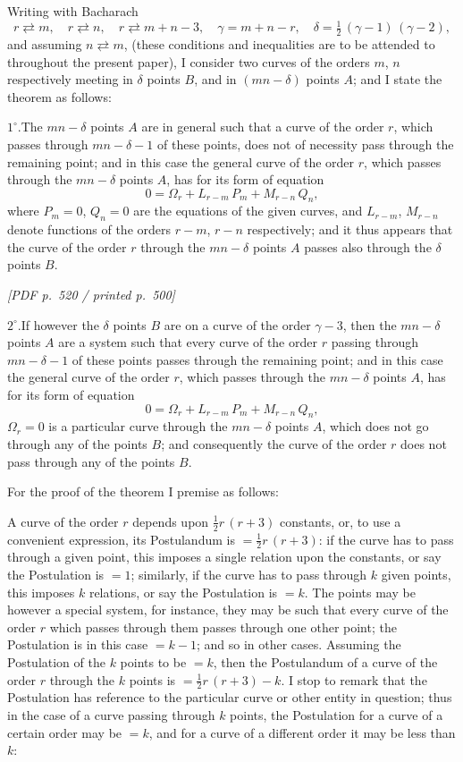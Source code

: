 \documentclass[11pt]{article}
\begin{document}
Writing with Bacharach
\[
r \rightleftarrows m,\quad r \rightleftarrows n,\quad r \rightleftarrows m + n - 3,\quad \gamma = m + n - r,\quad \delta = \tfrac{1}{2}\,(\gamma - 1)\,(\gamma - 2),
\]
and assuming $n \rightleftarrows m$, (these conditions and inequalities are to be attended to throughout the present paper), I consider two curves of the orders $m$, $n$ respectively meeting in $\delta$ points $B$, and in $(mn - \delta)$ points $A$; and I state the theorem as follows:

$1^{\circ}$.\quad The $mn - \delta$ points $A$ are in general such that a curve of the order $r$, which passes through $mn - \delta - 1$ of these points, does not of necessity pass through the remaining point; and in this case the general curve of the order $r$, which passes through the $mn - \delta$ points $A$, has for its form of equation
\[
0 = \Omega_{r} + L_{r-m}\,P_{m} + M_{r-n}\,Q_{n},
\]
where $P_{m} = 0$, $Q_{n} = 0$ are the equations of the given curves, and $L_{r-m}$, $M_{r-n}$ denote functions of the orders $r - m$, $r - n$ respectively; and it thus appears that the curve of the order $r$ through the $mn - \delta$ points $A$ passes also through the $\delta$ points $B$.

\vfill
\noindent\textit{[PDF p.~520 / printed p.~500]}
\newpage

\noindent $2^{\circ}$.\quad If however the $\delta$ points $B$ are on a curve of the order $\gamma - 3$, then the $mn - \delta$ points $A$ are a system such that every curve of the order $r$ passing through $mn - \delta - 1$ of these points passes through the remaining point; and in this case the general curve of the order $r$, which passes through the $mn - \delta$ points $A$, has for its form of equation
\[
0 = \Omega_{r} + L_{r-m}\,P_{m} + M_{r-n}\,Q_{n},
\]
$\Omega_{r} = 0$ is a particular curve through the $mn - \delta$ points $A$, which does not go through any of the points $B$; and consequently the curve of the order $r$ does not pass through any of the points $B$.

For the proof of the theorem I premise as follows:

A curve of the order $r$ depends upon $\tfrac{1}{2}r\,(r + 3)$ constants, or, to use a convenient expression, its Postulandum is $= \tfrac{1}{2}r\,(r + 3)$: if the curve has to pass through a given point, this imposes a single relation upon the constants, or say the Postulation is $= 1$; similarly, if the curve has to pass through $k$ given points, this imposes $k$ relations, or say the Postulation is $= k$. The points may be however a special system, for instance, they may be such that every curve of the order $r$ which passes through them passes through one other point; the Postulation is in this case $= k - 1$; and so in other cases. Assuming the Postulation of the $k$ points to be $= k$, then the Postulandum of a curve of the order $r$ through the $k$ points is $= \tfrac{1}{2}r\,(r + 3) - k$. I stop to remark that the Postulation has reference to the particular curve or other entity in question; thus in the case of a curve passing through $k$ points, the Postulation for a curve of a certain order may be $= k$, and for a curve of a different order it may be less than $k$:
\end{document}
